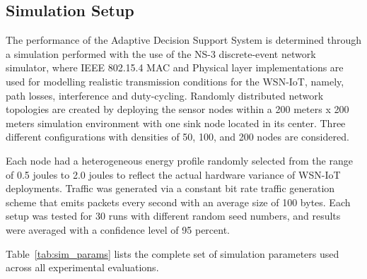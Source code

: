 \documentclass[a4paper,fleqn]{cas-dc}
\numberwithin{equation}{section}
\begin{document}
\subsection{Simulation Setup}
\label{subsec:simsetup}

The performance of the Adaptive Decision Support System is determined through
a simulation performed with the use of the NS-3 discrete-event network
simulator, where IEEE 802.15.4 MAC and Physical layer implementations are used
for modelling realistic transmission conditions for the WSN-IoT, namely,
path losses, interference and duty-cycling.
\cite{R9_Tumula2025OptimizingIoTSDNBlockchain,Laroui2021EdgeFogIoT}
Randomly distributed network topologies are created by deploying the sensor
nodes within a 200 meters x 200 meters simulation environment with one sink
node located in its center.
Three different configurations with densities of 50, 100, and 200 nodes
are considered.

Each node had a heterogeneous energy profile randomly selected from
the range of 0.5 joules to 2.0 joules to reflect the actual hardware
variance of WSN-IoT deployments.\cite{HaddadPajouh2019SurveyIoTSecurity,R21_Pessoa2024RITAResilientIoT}
Traffic was generated via a constant bit rate traffic generation
scheme that emits packets every second with an average size of 100
bytes. Each setup was tested for 30 runs with different random seed
numbers, and results were averaged with a confidence level of 95
percent.

Table~\ref{tab:sim_params} lists the complete set of simulation
parameters used across all experimental evaluations.
\end{document}
